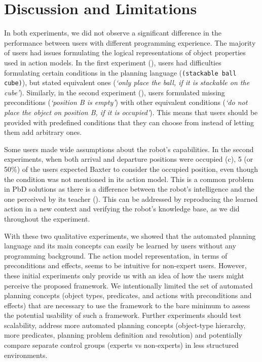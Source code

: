 




%

\section{Discussion and Limitations}
In both experiments, we did not observe a significant difference in the performance between users with different programming experience. 
The majority of users had issues formulating the logical representations of object properties used in action models. 
In the first experiment (), users had difficulties formulating certain conditions in the planning language (\eg \texttt{(stackable ball cube)}), but stated equivalent ones (\eg \textit{`only place the ball, if it is stackable on the cube'}).
Similarly, in the second experiment (), users formulated missing preconditions (\eg \textit{`position B is empty'}) with other equivalent conditions (\eg \textit{`do not place the object on position B, if it is occupied'}). 
This means that users should be provided with predefined conditions that they can choose from instead of letting them add arbitrary ones.

Some users made wide assumptions about the robot's capabilities. 
In the second experiments, when both arrival and departure positions were occupied (c), 5 (or 50\%) of the users expected Baxter to consider the occupied position, even though the condition was not mentioned in its action model.
This is a common problem in PbD solutions as there is a difference between the robot's intelligence and the one perceived by its teacher (\cite{suay2012practical}).
This can be addressed by reproducing the learned action in a new context and verifying the robot's knowledge base, as we did throughout the experiment.

With these two qualitative experiments, we showed that the automated planning language and its main concepts can easily be learned by users without any programming background. 
The action model representation, in terms of preconditions and effects, seems to be intuitive for non-expert users. 
However, these initial experiments only provide us with an idea of how the users might perceive the proposed framework. 
We intentionally limited the set of automated planning concepts (\ie object types, predicates, and actions with preconditions and effects) that are necessary to use the framework to the bare minimum to assess the potential usability of such a framework. 
Further experiments should test scalability, address more automated planning concepts (\eg object-type hierarchy, more predicates, planning problem definition and resolution) and potentially compare separate control groups (\eg experts vs non-experts) in less structured environments.


